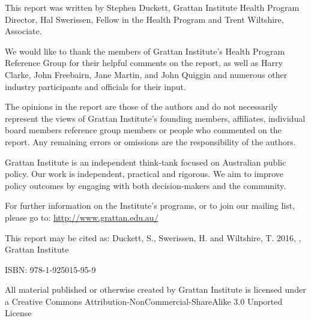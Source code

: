 This report was written by Stephen Duckett, Grattan Institute Health Program Director, Hal Swerissen, Fellow in the Health Program and Trent Wiltshire, Associate.

We would like to thank the members of Grattan Institute's Health Program Reference Group for their helpful comments on the report, as well as Harry Clarke, John Freebairn, Jane Martin, and John Quiggin and numerous other industry participants and officials for their input.

The opinions in the report are those of the authors and do not necessarily represent the views of Grattan Institute’s founding members, affiliates, individual board members reference group members or people who commented on the report. Any remaining errors or omissions are the responsibility of the authors.

Grattan Institute is an independent think-tank focused on Australian public policy. Our work is independent, practical and rigorous. We aim to improve policy outcomes by engaging with both decision-makers and the community.

For further information on the Institute's programs, or to join our mailing list, please go to:
\textcolor{blue}{\url{http://www.grattan.edu.au/}}

{\footnotesize
This report may be cited as:
\newline
Duckett, S., Swerissen, H. and Wiltshire, T. 2016, \emph{\mytitle}, Grattan Institute

ISBN: 978-1-925015-95-9

All material published or otherwise created by Grattan Institute is licensed under a Creative Commons Attribution-NonCommercial-ShareAlike 3.0 Unported License\par 
}
